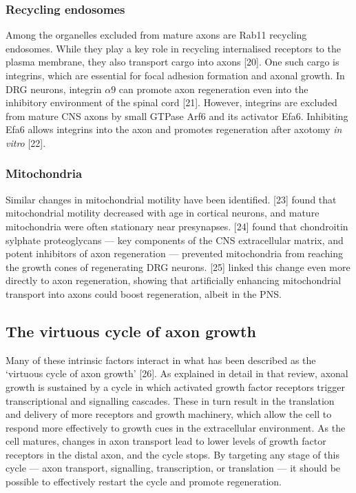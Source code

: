 \documentclass[
  12pt,
  a4paper,
]{book}
\begin{document}
\hypertarget{recycling-endosomes}{%
\subsubsection{Recycling endosomes}\label{recycling-endosomes}}

Among the organelles excluded from mature axons are Rab11 recycling endosomes. While they play a key role in recycling internalised receptors to the plasma membrane, they also transport cargo into axons {[}20{]}. One such cargo is integrins, which are essential for focal adhesion formation and axonal growth. In DRG neurons, integrin \(\alpha9\) can promote axon regeneration even into the inhibitory environment of the spinal cord {[}21{]}. However, integrins are excluded from mature CNS axons by small GTPase Arf6 and its activator Efa6. Inhibiting Efa6 allows integrins into the axon and promotes regeneration after axotomy \emph{in vitro} {[}22{]}.

\hypertarget{mitochondria}{%
\subsubsection{Mitochondria}\label{mitochondria}}

Similar changes in mitochondrial motility have been identified. {[}23{]} found that mitochondrial motility decreased with age in cortical neurons, and mature mitochondria were often stationary near presynapses. {[}24{]} found that chondroitin sylphate proteoglycans --- key components of the CNS extracellular matrix, and potent inhibitors of axon regeneration --- prevented mitochondria from reaching the growth cones of regenerating DRG neurons. {[}25{]} linked this change even more directly to axon regeneration, showing that artificially enhancing mitochondrial transport into axons could boost regeneration, albeit in the PNS.

\hypertarget{the-virtuous-cycle-of-axon-growth}{%
\subsection{The virtuous cycle of axon growth}\label{the-virtuous-cycle-of-axon-growth}}

Many of these intrinsic factors interact in what has been described as the `virtuous cycle of axon growth' {[}26{]}. As explained in detail in that review, axonal growth is sustained by a cycle in which activated growth factor receptors trigger transcriptional and signalling cascades. These in turn result in the translation and delivery of more receptors and growth machinery, which allow the cell to respond more effectively to growth cues in the extracellular environment. As the cell matures, changes in axon transport lead to lower levels of growth factor receptors in the distal axon, and the cycle stops. By targeting any stage of this cycle --- axon transport, signalling, transcription, or translation --- it should be possible to effectively restart the cycle and promote regeneration.
\end{document}
